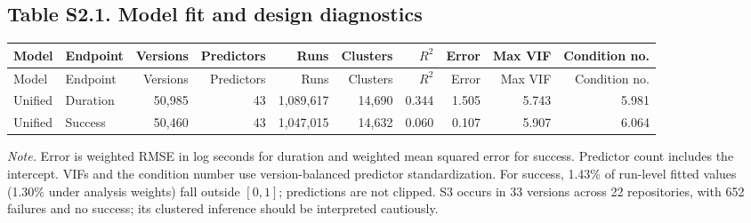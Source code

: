 \documentclass{article}
\begin{document}
\subsection*{Table S2.1. Model fit and design diagnostics}
\footnotesize\begin{longtable}{>{\raggedright\arraybackslash}p{2.4cm}>{\raggedright\arraybackslash}p{1.6cm}rrrrrrrr}
\toprule Model & Endpoint & Versions & Predictors & Runs & Clusters & $R^2$ & Error & Max VIF & Condition no.\\\midrule\endfirsthead
\toprule Model & Endpoint & Versions & Predictors & Runs & Clusters & $R^2$ & Error & Max VIF & Condition no.\\\midrule\endhead
Unified & Duration & 50,985 & 43 & 1,089,617 & 14,690 & 0.344 & 1.505 & 5.743 & 5.981 \\
Unified & Success & 50,460 & 43 & 1,047,015 & 14,632 & 0.060 & 0.107 & 5.907 & 6.064 \\
\bottomrule\end{longtable}
\noindent\textit{Note.} Error is weighted RMSE in log seconds for duration and weighted mean squared error for success. Predictor count includes the intercept. VIFs and the condition number use version-balanced predictor standardization. For success, 1.43\% of run-level fitted values (1.30\% under analysis weights) fall outside $[0,1]$; predictions are not clipped. S3 occurs in 33 versions across 22 repositories, with 652 failures and no success; its clustered inference should be interpreted cautiously.
\end{document}
